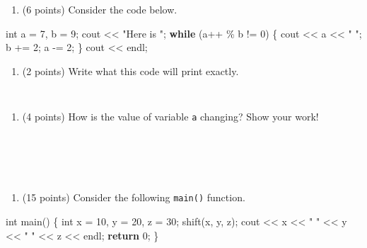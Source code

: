 \documentclass[
]{article}
\newenvironment{Shaded}{}{}
\newcommand{\ControlFlowTok}[1]{\textcolor[rgb]{0.00,0.44,0.13}{\textbf{#1}}}
\newcommand{\DataTypeTok}[1]{\textcolor[rgb]{0.56,0.13,0.00}{#1}}
\newcommand{\DecValTok}[1]{\textcolor[rgb]{0.25,0.63,0.44}{#1}}
\newcommand{\NormalTok}[1]{#1}
\newcommand{\StringTok}[1]{\textcolor[rgb]{0.25,0.44,0.63}{#1}}
\providecommand{\tightlist}{%
  \setlength{\itemsep}{0pt}\setlength{\parskip}{0pt}}
\begin{document}
\begin{enumerate}
\def\labelenumi{\arabic{enumi}.}
\setcounter{enumi}{4}
\tightlist
\item
  (6 points) Consider the code below.
\end{enumerate}

\begin{Shaded}
\begin{Highlighting}[]
\DataTypeTok{int}\NormalTok{ a = }\DecValTok{7}\NormalTok{, b = }\DecValTok{9}\NormalTok{;}
\NormalTok{cout \textless{}\textless{} }\StringTok{"Here is "}\NormalTok{;}
\ControlFlowTok{while}\NormalTok{ (a++ \% b != }\DecValTok{0}\NormalTok{) \{}
\NormalTok{    cout \textless{}\textless{} a \textless{}\textless{} }\StringTok{" "}\NormalTok{;}
\NormalTok{    b += }\DecValTok{2}\NormalTok{;}
\NormalTok{    a {-}= }\DecValTok{2}\NormalTok{;}
\NormalTok{\}}
\NormalTok{cout \textless{}\textless{} endl;}
\end{Highlighting}
\end{Shaded}

\begin{enumerate}
\def\labelenumi{\alph{enumi}.}
\tightlist
\item
  (2 points) Write what this code will print exactly.
\end{enumerate}

\begin{verbatim}


\end{verbatim}

\begin{enumerate}
\def\labelenumi{\alph{enumi}.}
\setcounter{enumi}{1}
\tightlist
\item
  (4 points) How is the value of variable \texttt{a} changing? Show your
  work!
\end{enumerate}

\begin{verbatim}





\end{verbatim}

\begin{enumerate}
\def\labelenumi{\arabic{enumi}.}
\setcounter{enumi}{5}
\tightlist
\item
  (15 points) Consider the following \texttt{main()} function.
\end{enumerate}

\begin{Shaded}
\begin{Highlighting}[]
\DataTypeTok{int}\NormalTok{ main() \{}
    \DataTypeTok{int}\NormalTok{ x = }\DecValTok{10}\NormalTok{, y = }\DecValTok{20}\NormalTok{, z = }\DecValTok{30}\NormalTok{;}
\NormalTok{    shift(x, y, z);}
\NormalTok{    cout \textless{}\textless{} x \textless{}\textless{} }\StringTok{" "}\NormalTok{ \textless{}\textless{} y \textless{}\textless{} }\StringTok{" "}\NormalTok{ \textless{}\textless{} z \textless{}\textless{} endl;}
    \ControlFlowTok{return} \DecValTok{0}\NormalTok{;}
\NormalTok{\}}
\end{Highlighting}
\end{Shaded}
\end{document}

